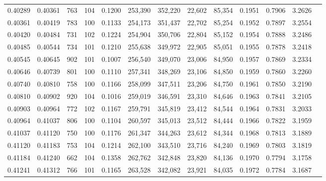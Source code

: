 \begin{tabular}{rrrrrrrrrrrrr}
0.40289 & 0.40361 &   763 & 104 &                                     0.1200 & 253,390 & 352,220 &  22,602 &  85,354 & 0.1951 & 0.7906 & 3.2626 \\
0.40361 & 0.40419 &   783 & 100 &                                     0.1133 & 254,173 & 351,437 &  22,702 &  85,254 & 0.1952 & 0.7897 & 3.2554 \\
0.40420 & 0.40484 &   731 & 102 &                                     0.1224 & 254,904 & 350,706 &  22,804 &  85,152 & 0.1954 & 0.7888 & 3.2486 \\
0.40485 & 0.40544 &   734 & 101 &                                     0.1210 & 255,638 & 349,972 &  22,905 &  85,051 & 0.1955 & 0.7878 & 3.2418 \\
0.40545 & 0.40645 &   902 & 101 &                                     0.1007 & 256,540 & 349,070 &  23,006 &  84,950 & 0.1957 & 0.7869 & 3.2334 \\
0.40646 & 0.40739 &   801 & 100 &                                     0.1110 & 257,341 & 348,269 &  23,106 &  84,850 & 0.1959 & 0.7860 & 3.2260 \\
0.40740 & 0.40810 &   758 & 100 &                                     0.1166 & 258,099 & 347,511 &  23,206 &  84,750 & 0.1961 & 0.7850 & 3.2190 \\
0.40810 & 0.40902 &   920 & 104 &                                     0.1016 & 259,019 & 346,591 &  23,310 &  84,646 & 0.1963 & 0.7841 & 3.2105 \\
0.40903 & 0.40964 &   772 & 102 &                                     0.1167 & 259,791 & 345,819 &  23,412 &  84,544 & 0.1964 & 0.7831 & 3.2033 \\
0.40964 & 0.41037 &   806 & 100 &                                     0.1104 & 260,597 & 345,013 &  23,512 &  84,444 & 0.1966 & 0.7822 & 3.1959 \\
0.41037 & 0.41120 &   750 & 100 &                                     0.1176 & 261,347 & 344,263 &  23,612 &  84,344 & 0.1968 & 0.7813 & 3.1889 \\
0.41120 & 0.41183 &   753 & 104 &                                     0.1214 & 262,100 & 343,510 &  23,716 &  84,240 & 0.1969 & 0.7803 & 3.1819 \\
0.41184 & 0.41240 &   662 & 104 &                                     0.1358 & 262,762 & 342,848 &  23,820 &  84,136 & 0.1970 & 0.7794 & 3.1758 \\
0.41241 & 0.41312 &   766 & 101 &                                     0.1165 & 263,528 & 342,082 &  23,921 &  84,035 & 0.1972 & 0.7784 & 3.1687 \\

\end{tabular}
